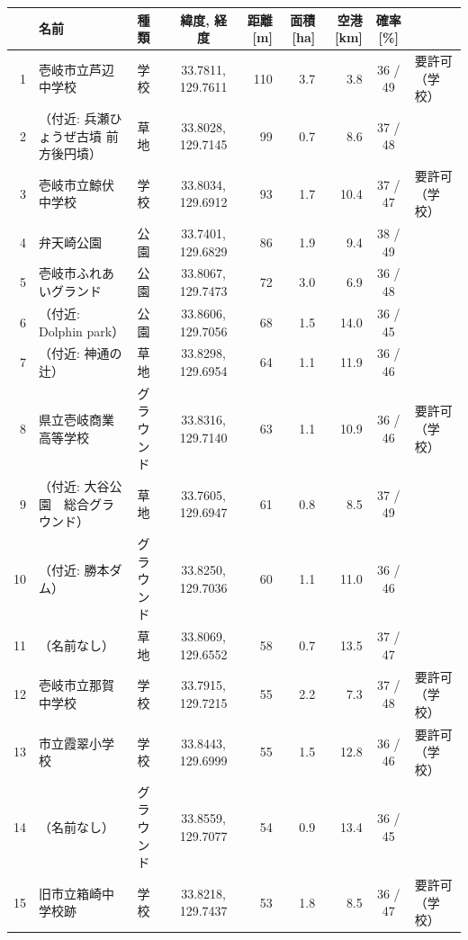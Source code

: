 \begin{tabular}{rllcrrrcl}
\toprule
 & 名前 & 種類 & 緯度, 経度 & 距離 [m] & 面積 [ha] & 空港 [km] & 確率 [\%] & \\
\midrule
1 & 壱岐市立芦辺中学校 & 学校 & 33.7811, 129.7611 & 110 & 3.7 & 3.8 & 36 / 49 & 要許可（学校） \\
2 & （付近: 兵瀬ひょうぜ古墳  前方後円墳） & 草地 & 33.8028, 129.7145 & 99 & 0.7 & 8.6 & 37 / 48 &  \\
3 & 壱岐市立鯨伏中学校 & 学校 & 33.8034, 129.6912 & 93 & 1.7 & 10.4 & 37 / 47 & 要許可（学校） \\
4 & 弁天崎公園 & 公園 & 33.7401, 129.6829 & 86 & 1.9 & 9.4 & 38 / 49 &  \\
5 & 壱岐市ふれあいグランド & 公園 & 33.8067, 129.7473 & 72 & 3.0 & 6.9 & 36 / 48 &  \\
6 & （付近: Dolphin park） & 公園 & 33.8606, 129.7056 & 68 & 1.5 & 14.0 & 36 / 45 &  \\
7 & （付近: 神通の辻） & 草地 & 33.8298, 129.6954 & 64 & 1.1 & 11.9 & 36 / 46 &  \\
8 & 県立壱岐商業高等学校 & グラウンド & 33.8316, 129.7140 & 63 & 1.1 & 10.9 & 36 / 46 & 要許可（学校） \\
9 & （付近: 大谷公園　総合グラウンド） & 草地 & 33.7605, 129.6947 & 61 & 0.8 & 8.5 & 37 / 49 &  \\
10 & （付近: 勝本ダム） & グラウンド & 33.8250, 129.7036 & 60 & 1.1 & 11.0 & 36 / 46 &  \\
11 & （名前なし） & 草地 & 33.8069, 129.6552 & 58 & 0.7 & 13.5 & 37 / 47 &  \\
12 & 壱岐市立那賀中学校 & 学校 & 33.7915, 129.7215 & 55 & 2.2 & 7.3 & 37 / 48 & 要許可（学校） \\
13 & 市立霞翠小学校 & 学校 & 33.8443, 129.6999 & 55 & 1.5 & 12.8 & 36 / 46 & 要許可（学校） \\
14 & （名前なし） & グラウンド & 33.8559, 129.7077 & 54 & 0.9 & 13.4 & 36 / 45 &  \\
15 & 旧市立箱崎中学校跡 & 学校 & 33.8218, 129.7437 & 53 & 1.8 & 8.5 & 36 / 47 & 要許可（学校） \\
\bottomrule
\end{tabular}
